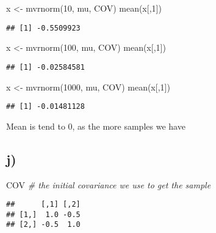 \documentclass[
]{article}
\newenvironment{Shaded}{\begin{snugshade}}{\end{snugshade}}
\newcommand{\CommentTok}[1]{\textcolor[rgb]{0.56,0.35,0.01}{\textit{#1}}}
\newcommand{\DecValTok}[1]{\textcolor[rgb]{0.00,0.00,0.81}{#1}}
\newcommand{\FunctionTok}[1]{\textcolor[rgb]{0.00,0.00,0.00}{#1}}
\newcommand{\NormalTok}[1]{#1}
\newcommand{\OtherTok}[1]{\textcolor[rgb]{0.56,0.35,0.01}{#1}}
\begin{document}
\begin{Shaded}
\begin{Highlighting}[]
\NormalTok{x }\OtherTok{\textless{}{-}} \FunctionTok{mvrnorm}\NormalTok{(}\DecValTok{10}\NormalTok{, mu, COV)}
\FunctionTok{mean}\NormalTok{(x[,}\DecValTok{1}\NormalTok{])}
\end{Highlighting}
\end{Shaded}

\begin{verbatim}
## [1] -0.5509923
\end{verbatim}

\begin{Shaded}
\begin{Highlighting}[]
\NormalTok{x }\OtherTok{\textless{}{-}} \FunctionTok{mvrnorm}\NormalTok{(}\DecValTok{100}\NormalTok{, mu, COV)}
\FunctionTok{mean}\NormalTok{(x[,}\DecValTok{1}\NormalTok{])}
\end{Highlighting}
\end{Shaded}

\begin{verbatim}
## [1] -0.02584581
\end{verbatim}

\begin{Shaded}
\begin{Highlighting}[]
\NormalTok{x }\OtherTok{\textless{}{-}} \FunctionTok{mvrnorm}\NormalTok{(}\DecValTok{1000}\NormalTok{, mu, COV)}
\FunctionTok{mean}\NormalTok{(x[,}\DecValTok{1}\NormalTok{])}
\end{Highlighting}
\end{Shaded}

\begin{verbatim}
## [1] -0.01481128
\end{verbatim}

Mean is tend to 0, as the more samples we have

\hypertarget{j}{%
\subsection{j)}\label{j}}

\begin{Shaded}
\begin{Highlighting}[]
\NormalTok{COV }\CommentTok{\# the initial covariance we use to get the sample}
\end{Highlighting}
\end{Shaded}

\begin{verbatim}
##      [,1] [,2]
## [1,]  1.0 -0.5
## [2,] -0.5  1.0
\end{verbatim}
\end{document}
